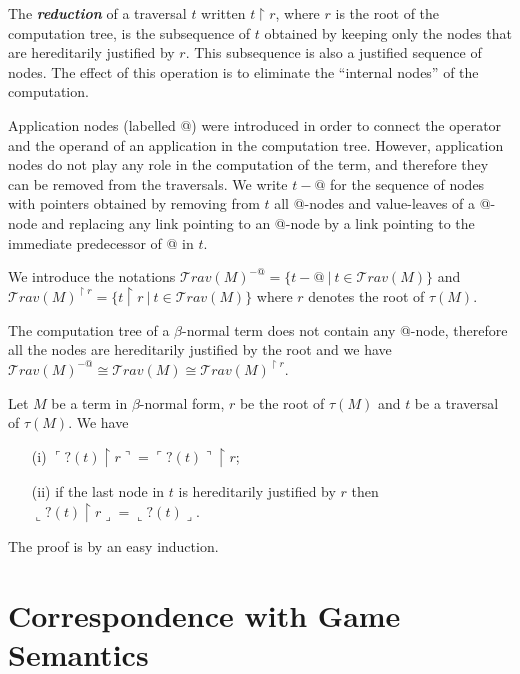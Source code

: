 \documentclass{llncs}
\newcommand\defname[1]{{\bf\em #1}\index{#1}}
\newcommand\travset{\mathcal{T}rav}
\newcommand{\oview}[1]{\llcorner #1 \lrcorner}
\newcommand{\pview}[1]{\ulcorner #1 \urcorner}
\begin{document}
The \defname{reduction} of a traversal $t$ written $ t \upharpoonright r$,
where $r$ is the root of the computation tree, is the subsequence of $t$
obtained by keeping only the nodes that are hereditarily
justified by $r$. This subsequence is also a justified sequence of nodes.
The effect of this operation is to eliminate the ``internal nodes'' of the computation.

Application nodes (labelled @) were introduced in order to connect the operator and
the operand of an application in the computation tree. However, application nodes do not play
any role in the computation of the term, and therefore
they can be removed from the traversals.
We write $t-@$ for the sequence of nodes with pointers obtained by
removing from $t$ all @-nodes and value-leaves of a @-node and
replacing any link pointing to an @-node by a link pointing to the immediate predecessor of @ in $t$.

We introduce the notations $\travset(M)^{-@} = \{ t - @ \ | \  t \in \travset(M) \}$ and $\travset(M)^{\upharpoonright r} = \{ t  \upharpoonright r \ | \  t  \in \travset(M) \}$ where $r$ denotes the root of $\tau(M)$.
\begin{remark}
The computation tree of a $\beta$-normal term does not contain any @-node, therefore all the nodes are
hereditarily justified by the root and we have $\travset(M)^{-@} \cong \travset(M) \cong  \travset(M)^{\upharpoonright r }$.
\end{remark}





\begin{lemma}
\label{lem:redtrav_trav} Let $M$ be a term in $\beta$-normal form,
$r$ be the root of $\tau(M)$ and $t$ be a traversal of $\tau(M)$. We
have
\begin{itemize}
\item[(i)] $ \pview{?(t) \upharpoonright  r } = \pview{?(t)} \upharpoonright r$;
\item[(ii)] if the last node in $t$ is hereditarily justified by $r$ then $ \oview{?(t) \upharpoonright r } = \oview{?(t)}$.
\end{itemize}
\end{lemma}
The proof is by an easy induction.


\section{Correspondence with Game Semantics}
\label{sec:assumptions}
\end{document}
